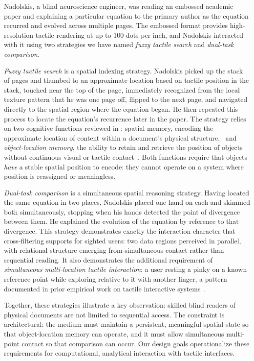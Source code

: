 \documentclass[12pt]{cmuthesis}
\begin{document}
Nadolskis, a blind neuroscience engineer, was reading an embossed academic paper and explaining a particular equation to the primary author as the equation recurred and evolved across multiple pages. The embossed format provides high-resolution tactile rendering at up to 100 dots per inch, and Nadolskis interacted with it using two strategies we have named \textit{fuzzy tactile search} and \textit{dual-task comparison}.

\textit{Fuzzy tactile search} is a spatial indexing strategy. Nadolskis picked up the stack of pages and thumbed to an approximate location based on tactile position in the stack, touched near the top of the page, immediately recognized from the local texture pattern that he was one page off, flipped to the next page, and navigated directly to the spatial region where the equation began. He then repeated this process to locate the equation's recurrence later in the paper. The strategy relies on two cognitive functions reviewed in : spatial memory, encoding the approximate location of content within a document's physical structure,~\cite{Broadbent2004, Cockburn2002, DellaSala1999} and \textit{object-location memory}, the ability to retain and retrieve the position of objects without continuous visual or tactile contact~\cite{GarciaNavarra2025, Li2011, Llana2025}. Both functions require that objects \textit{have} a stable spatial position to encode: they cannot operate on a system where position is reassigned or meaningless.

\textit{Dual-task comparison} is a simultaneous spatial reasoning strategy. Having located the same equation in two places, Nadolskis placed one hand on each and skimmed both simultaneously, stopping when his hands detected the point of divergence between them. He explained the evolution of the equation by reference to that divergence. This strategy demonstrates exactly the interaction character that cross-filtering supports for sighted users: two data regions perceived in parallel, with relational structure emerging from simultaneous contact rather than sequential reading. It also demonstrates the additional requirement of \textit{simultaneous multi-location tactile interaction}: a user resting a pinky on a known reference point while exploring relative to it with another finger, a pattern documented in prior empirical work on tactile interactive systems~\cite{Gorlewicz2020}.

Together, these strategies illustrate a key observation: skilled blind readers of physical documents are not limited to sequential access. The constraint is architectural: the medium must maintain a persistent, meaningful spatial state so that object-location memory can operate, and it must allow simultaneous multi-point contact so that comparison can occur. Our design goals operationalize these requirements for computational, analytical interaction with tactile interfaces.
\end{document}
